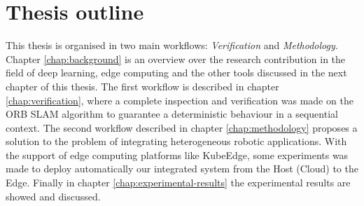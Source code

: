 \section{Thesis outline}
This thesis is organised in two main workflows: \textit{Verification} and \textit{Methodology}.
Chapter \ref{chap:background} is an overview over the research contribution in the field of  deep learning, edge computing and the other tools discussed in the next chapter of this thesis.
The first workflow is described in chapter \ref{chap:verification}, where a complete inspection and verification was made on the ORB SLAM algorithm to guarantee a deterministic behaviour in a sequential context.
The second workflow described in chapter \ref{chap:methodology} proposes a solution to the problem of integrating heterogeneous robotic applications.
With the support of edge computing platforms like KubeEdge, some experiments was made to deploy automatically our integrated system from the Host (Cloud) to the Edge.
Finally in chapter \ref{chap:experimental-results} the experimental results are showed and discussed.



\thispagestyle{empty}